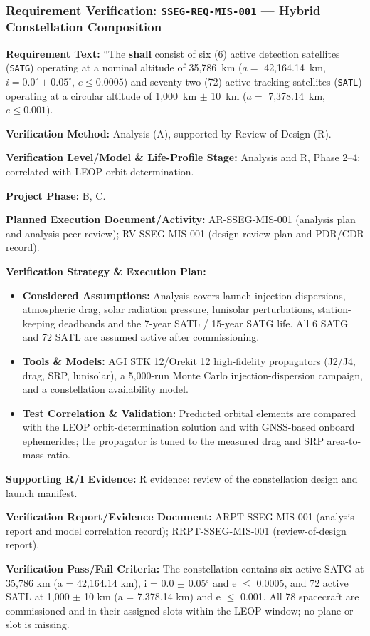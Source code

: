 \subsubsection{Requirement Verification: \texttt{SSEG-REQ-MIS-001} --- Hybrid Constellation Composition}
\label{ver:SSEG-REQ-MIS-001}
\textbf{Requirement Text:} ``The  \textbf{shall} consist of six (6) active  detection satellites (\texttt{SATG}) operating at a nominal altitude of 35,786~km ($a =$ 42,164.14~km, $i = 0.0^\circ \pm 0.05^\circ$, $e \le 0.0005$) and seventy-two (72) active  tracking satellites (\texttt{SATL}) operating at a circular altitude of 1,000~km $\pm$ 10~km ($a =$ 7,378.14~km, $e \le 0.001$).
\par\textbf{Verification Method:} Analysis (A), supported by Review of Design (R).
\par\textbf{Verification Level/Model \& Life-Profile Stage:} Analysis and R, Phase 2--4; correlated with LEOP orbit determination.
\par\textbf{Project Phase:} B, C.
\par\textbf{Planned Execution Document/Activity:} AR-SSEG-MIS-001 (analysis plan and analysis peer review); RV-SSEG-MIS-001 (design-review plan and PDR/CDR record).
\par\textbf{Verification Strategy \& Execution Plan:}
\begin{itemize}
\item \textbf{Considered Assumptions:} Analysis covers launch injection dispersions, atmospheric drag, solar radiation pressure, lunisolar perturbations, station-keeping deadbands and the 7-year SATL / 15-year SATG life. All 6 SATG and 72 SATL are assumed active after commissioning.
\item \textbf{Tools \& Models:} AGI STK 12/Orekit 12 high-fidelity propagators (J2/J4, drag, SRP, lunisolar), a 5,000-run Monte Carlo injection-dispersion campaign, and a constellation availability model.
\item \textbf{Test Correlation \& Validation:} Predicted orbital elements are compared with the LEOP orbit-determination solution and with GNSS-based onboard ephemerides; the propagator is tuned to the measured drag and SRP area-to-mass ratio.
\end{itemize}
\par\textbf{Supporting R/I Evidence:} R evidence: review of the constellation design and launch manifest.
\par\textbf{Verification Report/Evidence Document:} ARPT-SSEG-MIS-001 (analysis report and model correlation record); RRPT-SSEG-MIS-001 (review-of-design report).
\par\textbf{Verification Pass/Fail Criteria:} The constellation contains six active SATG at 35,786 km (a = 42,164.14 km), i = 0.0 $\pm$ 0.05$^\circ$ and e $\le$ 0.0005, and 72 active SATL at 1,000 $\pm$ 10 km (a = 7,378.14 km) and e $\le$ 0.001. All 78 spacecraft are commissioned and in their assigned slots within the LEOP window; no plane or slot is missing.
\par\medskip
